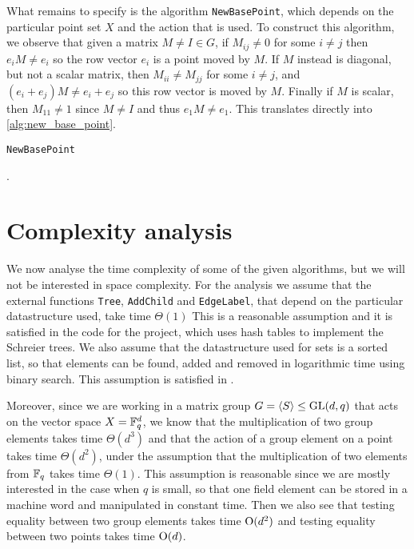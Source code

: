 What remains to specify is the algorithm \texttt{NewBasePoint}, which
depends on the particular point set $X$ and the action that is used.
To construct this algorithm, we observe that given a matrix $M \neq I
\in G$, if $M_{ij} \neq 0$ for some $i \neq j$ then $e_i M \neq e_i$
so the row vector $e_i$ is a point moved by $M$. If $M$ instead is
diagonal, but not a scalar matrix, then $M_{ii} \neq M_{jj}$ for some
$i \neq j$, and $(e_i + e_j) M \neq e_i + e_j$ so this row vector is
moved by $M$. Finally if $M$ is scalar, then $M_{11} \neq 1$ since $M
\neq I$ and thus $e_1 M \neq e_1$. This translates directly into \ref{alg:new_base_point}.

\begin{algorithm} 
\dontprintsemicolon
\caption{\texttt{NewBasePoint}}
.
\Begin
{
  {
    {
      {
      }
    }
  }
  {
    {
      {
      }
    }
  }
}
\label{alg:new_base_point}
\end{algorithm}

\section{Complexity analysis}
We now analyse the time complexity of some of the given algorithms, but we
will not be interested in space complexity. For the analysis we assume
that the external functions \texttt{Tree}, \texttt{AddChild} and
\texttt{EdgeLabel}, that depend on the particular datastructure used,
take time $\Theta(1)$ This is a reasonable assumption and it is satisfied
in the code for the project, which uses hash tables to implement the Schreier trees. We also assume that the datastructure
used for sets is a sorted list, so that elements can be found, added and
removed in logarithmic time using binary search. This assumption is
satisfied in \GAP.

Moreover, since we are working in a matrix group $G = \left\langle S \right\rangle \leq
\operatorname{GL}(d, q)$ that acts on the vector space $X = \mathbb{F}_q^d$, we know that
the multiplication of two group elements takes time $\Theta(d^3)$ and
that the action of a group element on a point takes time
$\Theta(d^2)$, under the assumption that the multiplication of two
elements from $\mathbb{F}_q$ takes time $\Theta(1)$. This assumption is
reasonable since we are mostly interested in the case when $q$ is
small, so that one field element can be stored in a machine word and manipulated in constant time. Then
we also see that testing equality between two group elements takes
time $\operatorname{O} ( d^2 )$ and testing equality between two points takes time
$\operatorname{O} ( d )$.

